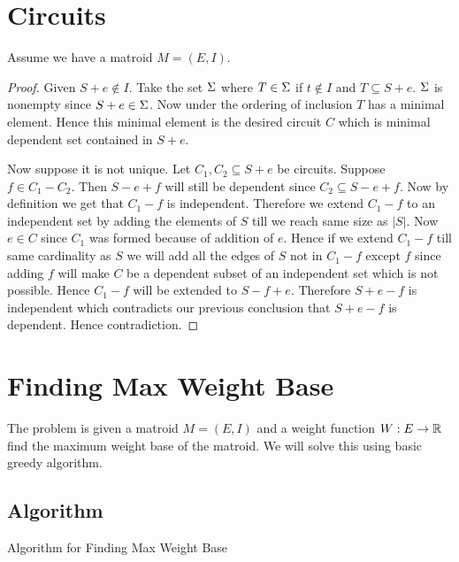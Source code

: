 \documentclass[twoside]{article}
\begin{document}
\section{Circuits}
Assume we have a matroid $M=(E,I)$. 
\begin{proof}
	Given $S+e\notin I$. Take the set $\Sigma$ where $T\in \Sigma$ if $t\notin I$ and $T\subseteq S+e$. $\Sigma$ is nonempty since $S+e\in \Sigma$. Now under the ordering of inclusion $T$ has a minimal element. Hence this minimal element is the desired circuit $C$ which is minimal dependent set contained in $S+e$.
	
	Now suppose it is not unique. Let $C_1,C_2\subseteq S+e$ be circuits. Suppose $f\in C_1-C_2$. Then $S-e+f$ will still be dependent since $C_2\subseteq S-e+f$. Now by definition we get that $C_1-f$ is independent. Therefore we extend $C_1-f$ to an independent set by adding the elements of $S$ till we reach same size as $|S|$. Now $e\in C$ since $C_1$ was formed because of addition of $e$. Hence if we extend $C_1-f$ till same cardinality as $S$ we will add all the edges of $S$ not in $C_1-f$ except $f$ since adding $f$ will make $C$ be a dependent subset of an independent set which is not possible. Hence $C_1-f$ will be extended to $S-f+e$. Therefore $S+e-f$ is independent which contradicts our previous conclusion that $S+e-f$ is dependent. Hence contradiction.
\end{proof}

\section{Finding Max Weight Base}
The problem is given a matroid $M=(E,I)$ and a weight function $W:E\to \mathbb{R}$ find the maximum weight base of the matroid. We will solve this using basic greedy algorithm. 
\subsection{Algorithm}
\begin{algorithm}
	\DontPrintSemicolon
	\caption{Algorithm for Finding Max Weight Base}
\end{algorithm}
\end{document}
